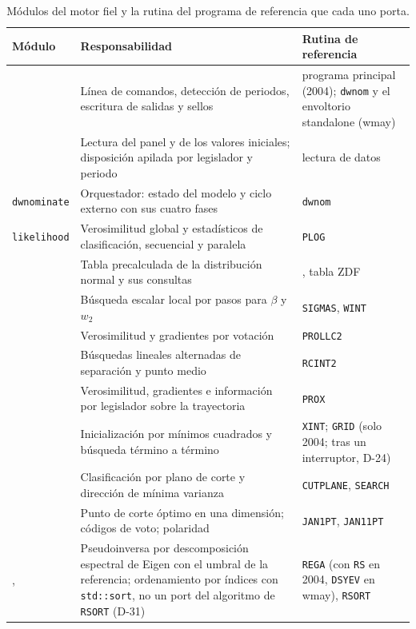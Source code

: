\begin{table}[H]
\centering
\caption{Módulos del motor fiel y la rutina del programa de referencia que cada uno porta.}
\label{tab:correspondencia}
\footnotesize
\begin{tabular}{L{3.3cm}L{5.8cm}L{3.2cm}}
\toprule
Módulo & Responsabilidad & Rutina de referencia \\
\midrule
{} & Línea de comandos, detección de periodos, escritura de salidas y
sellos & programa principal (2004); \texttt{dwnom} y el envoltorio standalone (wmay) \\
 & Lectura del panel y de los valores iniciales; disposición apilada por
legislador y periodo & lectura de datos \\
\texttt{dwnominate} & Orquestador: estado del modelo y ciclo externo con sus cuatro fases &
\texttt{dwnom} \\
\texttt{likelihood} & Verosimilitud global y estadísticos de clasificación, secuencial y
paralela & \texttt{PLOG} \\
 & Tabla precalculada de la distribución normal y sus consultas &
, tabla ZDF \\
 & Búsqueda escalar local por pasos para $\beta$ y $w_2$ &
\texttt{SIGMAS}, \texttt{WINT} \\
 & Verosimilitud y gradientes por votación & \texttt{PROLLC2} \\
 & Búsquedas lineales alternadas de separación y punto medio
& \texttt{RCINT2} \\
 & Verosimilitud, gradientes e información por legislador
sobre la trayectoria & \texttt{PROX} \\
 & Inicialización por mínimos cuadrados y búsqueda término
a término & \texttt{XINT}; \texttt{GRID} (solo 2004; tras un interruptor, D-24) \\
 & Clasificación por plano de corte y dirección de mínima varianza
& \texttt{CUTPLANE}, \texttt{SEARCH} \\
 & Punto de corte óptimo en una dimensión; códigos de voto;
polaridad & \texttt{JAN1PT}, \texttt{JAN11PT} \\
,  & Pseudoinversa por descomposición espectral de
Eigen con el umbral de la referencia; ordenamiento por índices con \texttt{std::sort}, no un
port del algoritmo de \texttt{RSORT} (D-31) & \texttt{REGA} (con \texttt{RS} en 2004,
\texttt{DSYEV} en wmay), \texttt{RSORT} \\
\bottomrule
\end{tabular}
\end{table}


